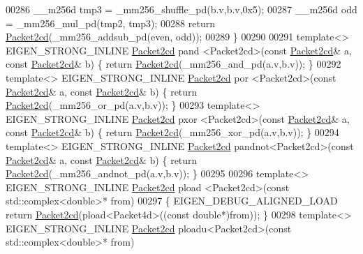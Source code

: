 \begin{DoxyCode}
00286   \_\_m256d tmp3 = \_mm256\_shuffle\_pd(b.v,b.v,0x5);
00287   \_\_m256d odd  = \_mm256\_mul\_pd(tmp2, tmp3);
00288   \textcolor{keywordflow}{return} \hyperlink{struct_eigen_1_1internal_1_1_packet2cd}{Packet2cd}(\_mm256\_addsub\_pd(even, odd));
00289 \}
00290 
00291 \textcolor{keyword}{template}<> EIGEN\_STRONG\_INLINE \hyperlink{struct_eigen_1_1internal_1_1_packet2cd}{Packet2cd} pand   <Packet2cd>(\textcolor{keyword}{const} 
      \hyperlink{struct_eigen_1_1internal_1_1_packet2cd}{Packet2cd}& a, \textcolor{keyword}{const} \hyperlink{struct_eigen_1_1internal_1_1_packet2cd}{Packet2cd}& b) \{ \textcolor{keywordflow}{return} \hyperlink{struct_eigen_1_1internal_1_1_packet2cd}{Packet2cd}(\_mm256\_and\_pd(a.v,b.v)); \}
00292 \textcolor{keyword}{template}<> EIGEN\_STRONG\_INLINE \hyperlink{struct_eigen_1_1internal_1_1_packet2cd}{Packet2cd} por    <Packet2cd>(\textcolor{keyword}{const} 
      \hyperlink{struct_eigen_1_1internal_1_1_packet2cd}{Packet2cd}& a, \textcolor{keyword}{const} \hyperlink{struct_eigen_1_1internal_1_1_packet2cd}{Packet2cd}& b) \{ \textcolor{keywordflow}{return} \hyperlink{struct_eigen_1_1internal_1_1_packet2cd}{Packet2cd}(\_mm256\_or\_pd(a.v,b.v)); \}
00293 \textcolor{keyword}{template}<> EIGEN\_STRONG\_INLINE \hyperlink{struct_eigen_1_1internal_1_1_packet2cd}{Packet2cd} pxor   <Packet2cd>(\textcolor{keyword}{const} 
      \hyperlink{struct_eigen_1_1internal_1_1_packet2cd}{Packet2cd}& a, \textcolor{keyword}{const} \hyperlink{struct_eigen_1_1internal_1_1_packet2cd}{Packet2cd}& b) \{ \textcolor{keywordflow}{return} \hyperlink{struct_eigen_1_1internal_1_1_packet2cd}{Packet2cd}(\_mm256\_xor\_pd(a.v,b.v)); \}
00294 \textcolor{keyword}{template}<> EIGEN\_STRONG\_INLINE \hyperlink{struct_eigen_1_1internal_1_1_packet2cd}{Packet2cd} pandnot<Packet2cd>(\textcolor{keyword}{const} 
      \hyperlink{struct_eigen_1_1internal_1_1_packet2cd}{Packet2cd}& a, \textcolor{keyword}{const} \hyperlink{struct_eigen_1_1internal_1_1_packet2cd}{Packet2cd}& b) \{ \textcolor{keywordflow}{return} \hyperlink{struct_eigen_1_1internal_1_1_packet2cd}{Packet2cd}(\_mm256\_andnot\_pd(a.v,b.v));
       \}
00295 
00296 \textcolor{keyword}{template}<> EIGEN\_STRONG\_INLINE \hyperlink{struct_eigen_1_1internal_1_1_packet2cd}{Packet2cd} pload <Packet2cd>(\textcolor{keyword}{const} std::complex<double>* from)
00297 \{ EIGEN\_DEBUG\_ALIGNED\_LOAD \textcolor{keywordflow}{return} \hyperlink{struct_eigen_1_1internal_1_1_packet2cd}{Packet2cd}(pload<Packet4d>((\textcolor{keyword}{const} \textcolor{keywordtype}{double}*)from)); \}
00298 \textcolor{keyword}{template}<> EIGEN\_STRONG\_INLINE \hyperlink{struct_eigen_1_1internal_1_1_packet2cd}{Packet2cd} ploadu<Packet2cd>(\textcolor{keyword}{const} std::complex<double>* from)

\end{DoxyCode}
